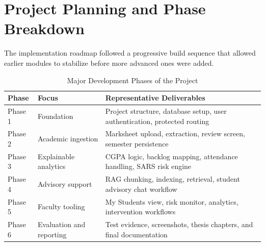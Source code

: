 \section{Project Planning and Phase Breakdown}
The implementation roadmap followed a progressive build sequence that allowed earlier modules to stabilize before more advanced ones were added.

\begin{table}[H]
\centering
\caption{Major Development Phases of the Project}
\begin{tabularx}{\textwidth}{>{\raggedright\arraybackslash}p{} >{\raggedright\arraybackslash}p{} >{\raggedright\arraybackslash}X}
\toprule
\textbf{Phase} & \textbf{Focus} & \textbf{Representative Deliverables} \\
\midrule
Phase 1 & Foundation & Project structure, database setup, user authentication, protected routing \\
Phase 2 & Academic ingestion & Marksheet upload, extraction, review screen, semester persistence \\
Phase 3 & Explainable analytics & CGPA logic, backlog mapping, attendance handling, SARS risk engine \\
Phase 4 & Advisory support & RAG chunking, indexing, retrieval, student advisory chat workflow \\
Phase 5 & Faculty tooling & My Students view, risk monitor, analytics, intervention workflows \\
Phase 6 & Evaluation and reporting & Test evidence, screenshots, thesis chapters, and final documentation \\
\bottomrule
\end{tabularx}
\end{table}

